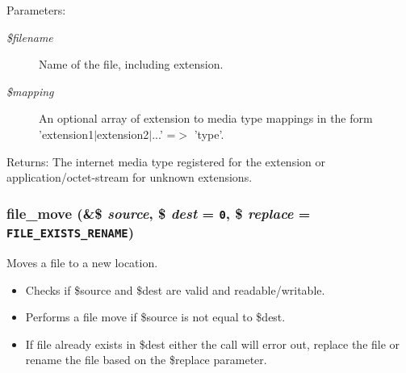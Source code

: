 \begin{Desc}
\item[Parameters:]
\begin{description}
\item[{\em \$filename}]Name of the file, including extension. \item[{\em \$mapping}]An optional array of extension to media type mappings in the form 'extension1$|$extension2$|$...' =$>$ 'type'.\end{description}
\end{Desc}
\begin{Desc}
\item[Returns:]The internet media type registered for the extension or application/octet-stream for unknown extensions. \end{Desc}
\hypertarget{group__file_gd1dc7d1fd2d90de77d53d4fb90fb16b3}{
\subsubsection[{file\_\-move}]{\setlength{\rightskip}{0pt plus 5cm}file\_\-move (\&\$ {\em source}, \/  \$ {\em dest} = {\tt 0}, \/  \$ {\em replace} = {\tt FILE\_\-EXISTS\_\-RENAME})}}
\label{group__file_gd1dc7d1fd2d90de77d53d4fb90fb16b3}


Moves a file to a new location.

\begin{itemize}
\item Checks if \$source and \$dest are valid and readable/writable.\item Performs a file move if \$source is not equal to \$dest.\item If file already exists in \$dest either the call will error out, replace the file or rename the file based on the \$replace parameter.\end{itemize}


